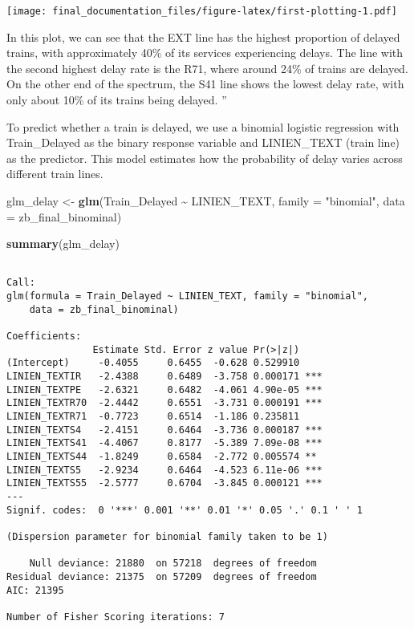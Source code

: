 \documentclass[
]{article}
\newenvironment{Shaded}{\begin{snugshade}}{\end{snugshade}}
\newcommand{\AttributeTok}[1]{\textcolor[rgb]{0.13,0.29,0.53}{#1}}
\newcommand{\FunctionTok}[1]{\textcolor[rgb]{0.13,0.29,0.53}{\textbf{#1}}}
\newcommand{\NormalTok}[1]{#1}
\newcommand{\OtherTok}[1]{\textcolor[rgb]{0.56,0.35,0.01}{#1}}
\newcommand{\SpecialCharTok}[1]{\textcolor[rgb]{0.81,0.36,0.00}{\textbf{#1}}}
\newcommand{\StringTok}[1]{\textcolor[rgb]{0.31,0.60,0.02}{#1}}
\begin{document}
\texttt{[image: final\_documentation\_files/figure-latex/first-plotting-1.pdf]}

In this plot, we can see that the EXT line has the highest proportion of
delayed trains, with approximately 40\% of its services experiencing
delays. The line with the second highest delay rate is the R71, where
around 24\% of trains are delayed. On the other end of the spectrum, the
S41 line shows the lowest delay rate, with only about 10\% of its trains
being delayed. ''

To predict whether a train is delayed, we use a binomial logistic
regression with Train\_Delayed as the binary response variable and
LINIEN\_TEXT (train line) as the predictor. This model estimates how the
probability of delay varies across different train lines.

\begin{Shaded}
\begin{Highlighting}[]
\NormalTok{glm\_delay }\OtherTok{\textless{}{-}} \FunctionTok{glm}\NormalTok{(Train\_Delayed }\SpecialCharTok{\textasciitilde{}}\NormalTok{ LINIEN\_TEXT, }\AttributeTok{family =} \StringTok{"binomial"}\NormalTok{, }\AttributeTok{data =}\NormalTok{ zb\_final\_binominal)}

\FunctionTok{summary}\NormalTok{(glm\_delay)}
\end{Highlighting}
\end{Shaded}

\begin{verbatim}

Call:
glm(formula = Train_Delayed ~ LINIEN_TEXT, family = "binomial", 
    data = zb_final_binominal)

Coefficients:
               Estimate Std. Error z value Pr(>|z|)    
(Intercept)     -0.4055     0.6455  -0.628 0.529910    
LINIEN_TEXTIR   -2.4388     0.6489  -3.758 0.000171 ***
LINIEN_TEXTPE   -2.6321     0.6482  -4.061 4.90e-05 ***
LINIEN_TEXTR70  -2.4442     0.6551  -3.731 0.000191 ***
LINIEN_TEXTR71  -0.7723     0.6514  -1.186 0.235811    
LINIEN_TEXTS4   -2.4151     0.6464  -3.736 0.000187 ***
LINIEN_TEXTS41  -4.4067     0.8177  -5.389 7.09e-08 ***
LINIEN_TEXTS44  -1.8249     0.6584  -2.772 0.005574 ** 
LINIEN_TEXTS5   -2.9234     0.6464  -4.523 6.11e-06 ***
LINIEN_TEXTS55  -2.5777     0.6704  -3.845 0.000121 ***
---
Signif. codes:  0 '***' 0.001 '**' 0.01 '*' 0.05 '.' 0.1 ' ' 1

(Dispersion parameter for binomial family taken to be 1)

    Null deviance: 21880  on 57218  degrees of freedom
Residual deviance: 21375  on 57209  degrees of freedom
AIC: 21395

Number of Fisher Scoring iterations: 7
\end{verbatim}
\end{document}
